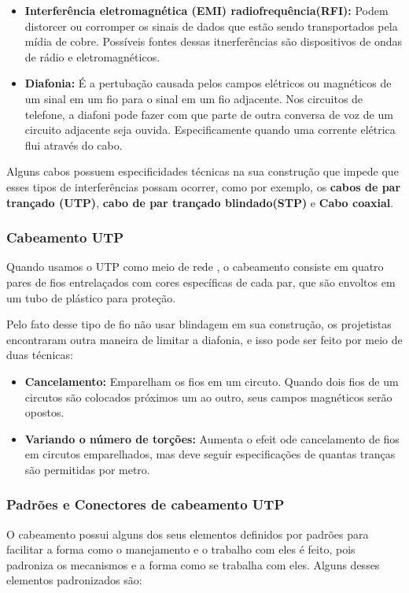 \documentclass[12pt a4paper]{paper}
\begin{document}
\begin{itemize}
  \item \textbf{Interferência eletromagnética (EMI) radiofrequência(RFI): } Podem distorcer ou corromper os sinais de dados que estão sendo transportados pela mídia de cobre. Possíveis fontes dessas itnerferências são dispositivos de ondas de rádio e eletromagnéticos.
  \item \textbf{Diafonia: }É a pertubação causada pelos campos elétricos ou magnéticos de um sinal em um fio para o sinal em um fio adjacente. Nos circuitos de telefone, a diafoni pode fazer com que parte de outra conversa de voz de um circuito adjacente seja ouvida. Especificamente quando uma corrente elétrica flui através do cabo.
\end{itemize}

Alguns cabos possuem especificidades técnicas na sua construção que impede que esses 
tipos de interferências possam ocorrer, como por exemplo, os 
\textbf{cabos de par trançado (UTP)}, \textbf{cabo de par trançado blindado(STP)} e 
\textbf{Cabo coaxial}.

\subsubsection{Cabeamento UTP} %
\label{sec:Cabeamento UTP}
Quando usamos o UTP como meio de rede , o cabeamento 
consiste em quatro pares de fios entrelaçados com cores 
específicas de cada par, que são envoltos em um tubo de 
plástico para proteção. 

Pelo fato desse tipo de fio não usar blindagem em sua 
construção, os projetistas encontraram outra maneira de 
limitar a diafonia, e isso pode ser feito por meio de 
duas técnicas: 

\begin{itemize}
  \item \textbf{Cancelamento: }Emparelham os fios em um circuto. Quando dois fios de um circutos são colocados próximos um ao outro, seus campos magnéticos serão opostos.
  \item \textbf{Variando o número de torções: }Aumenta o efeit ode cancelamento de fios em circutos emparelhados, mas deve seguir especificações de quantas tranças são permitidas por metro.
\end{itemize}


\subsubsection{Padrões e Conectores de cabeamento UTP} %
\label{sec:Padrões e Conectores de cabeamento UTP}
O cabeamento possui alguns dos seus elementos definidos 
por padrões para facilitar a forma como o manejamento e o 
trabalho com eles é feito, pois padroniza os mecanismos e 
a forma como se trabalha com eles. Alguns desses elementos 
padronizados são: 
\end{document}
